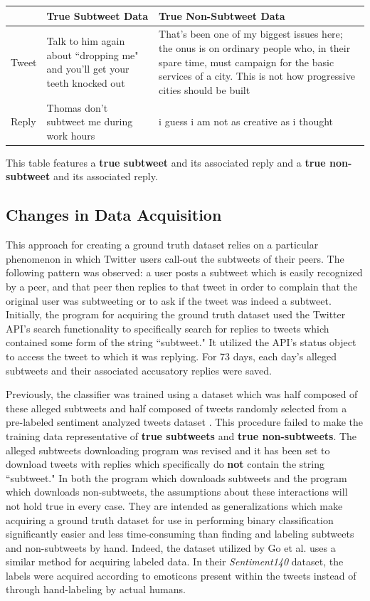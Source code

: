 \documentclass[11pt, twoside, reqno]{book}
\begin{document}
\begin{center}
	\begin{tabular}{ | p{5em} | p{15em} | p{15em} | }
		\hline
		& True Subtweet Data& True Non-Subtweet Data
		\\
		\hline
		Tweet&Talk to him again about ``dropping me" and you'll get your teeth knocked out&That's been one of my biggest issues here; the onus is on ordinary people who, in their spare time, must campaign for the basic services of a city. This is not how progressive cities should be built
		\\
		\hline
		Reply&Thomas don't subtweet me during work hours&i guess i am not as creative as i thought
		\\
		\hline
	\end{tabular}
\end{center}

\noindent
This table features a \textbf{true subtweet} and its associated reply and a \textbf{true non-subtweet} and its associated reply.

\subsection{Changes in Data Acquisition}
\label{changes_in_data}

This approach for creating a ground truth dataset relies on a particular phenomenon in which Twitter users call-out the subtweets of their peers. The following pattern was observed: a user posts a subtweet which is easily recognized by a peer, and that peer then replies to that tweet in order to complain that the original user was subtweeting or to ask if the tweet was indeed a subtweet. Initially, the program for acquiring the ground truth dataset used the Twitter API's search functionality to specifically search for replies to tweets which contained some form of the string ``subtweet." It utilized the API's status object to access the tweet to which it was replying. For 73 days, each day's alleged subtweets and their associated accusatory replies were saved.

Previously, the classifier was trained using a dataset which was half composed of these alleged subtweets and half composed of tweets randomly selected from a pre-labeled sentiment analyzed tweets dataset \cite{go_dataset}. This procedure failed to make the training data representative of \textbf{true subtweets} and \textbf{true non-subtweets}. The alleged subtweets downloading program was revised and it has been set to download tweets with replies which specifically do \textbf{not} contain the string ``subtweet." In both the program which downloads subtweets and the program which downloads non-subtweets, the assumptions about these interactions will not hold true in every case. They are intended as generalizations which make acquiring a ground truth dataset for use in performing binary classification significantly easier and less time-consuming than finding and labeling subtweets and non-subtweets by hand. Indeed, the dataset utilized by Go et al. uses a similar method for acquiring labeled data. In their \textit{Sentiment140} dataset, the labels were acquired according to emoticons present within the tweets instead of through hand-labeling by actual humans.
\end{document}
